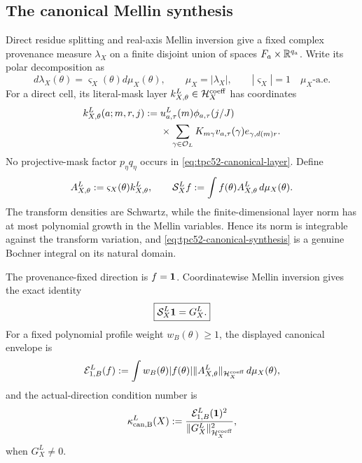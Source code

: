 \subsection{The canonical Mellin synthesis}

Direct residue splitting and real-axis Mellin inversion give a fixed
complex provenance measure \(\lambda_X\) on a finite disjoint union of
spaces \(F_a\times\mathbb R^{q_a}\).  Write its polar decomposition as
\begin{equation}
 d\lambda_X(\theta)=\varsigma_X(\theta)d\mu_X(\theta),
 \qquad \mu_X=|\lambda_X|,
 \qquad |\varsigma_X|=1\quad\mu_X\text{-a.e.}
 \label{eq:tpc52-polar-measure}
\end{equation}
For a direct cell, its literal-mask layer
\(k_{X,\theta}^L\in\mathcal H_X^{\rm coeff}\) has coordinates
\begin{align}
 k_{X,\theta}^L(a;m,r,j)
 :={}&u_{a,\tau}^L(m)\phi_{a,\tau}(j/J)
 \notag\\
 &\times\sum_{\gamma\in\mathcal O_L}
 K_{m\gamma}v_{a,\tau}(\gamma)e_{\gamma,d(m)r}.
 \label{eq:tpc52-canonical-layer}
\end{align}
No projective-mask factor \(p_\eta q_\eta\) occurs in
\eqref{eq:tpc52-canonical-layer}.  Define
\begin{equation}
 A_{X,\theta}^L:=\varsigma_X(\theta)k_{X,\theta}^L,
 \qquad
 \mathcal S_X^Lf:=\int f(\theta)A_{X,\theta}^L\,d\mu_X(\theta).
 \label{eq:tpc52-canonical-synthesis}
\end{equation}
The transform densities are Schwartz, while the finite-dimensional layer
norm has at most polynomial growth in the Mellin variables.  Hence its norm
is integrable against the transform variation, and
\eqref{eq:tpc52-canonical-synthesis} is a genuine Bochner integral on its
natural domain.

The provenance-fixed direction is \(f=\mathbf 1\).  Coordinatewise Mellin
inversion gives the exact identity
\begin{equation}
 \boxed{\mathcal S_X^L\mathbf 1=G_X^L.}
 \label{eq:tpc52-actual-direction}
\end{equation}
For a fixed polynomial profile weight \(w_B(\theta)\ge1\), the displayed
canonical envelope is
\begin{equation}
 \mathcal E_{1,B}^L(f)
 :=\int w_B(\theta)|f(\theta)|
 \|A_{X,\theta}^L\|_{\mathcal H_X^{\rm coeff}}\,d\mu_X(\theta),
 \label{eq:tpc52-canonical-envelope}
\end{equation}
and the actual-direction condition number is
\begin{equation}
 \kappa_{\rm can,B}^L(X)
 :=\frac{\mathcal E_{1,B}^L(\mathbf 1)^2}
         {\|G_X^L\|_{\mathcal H_X^{\rm coeff}}^2},
 \label{eq:tpc52-canonical-condition}
\end{equation}
when \(G_X^L\ne0\).

